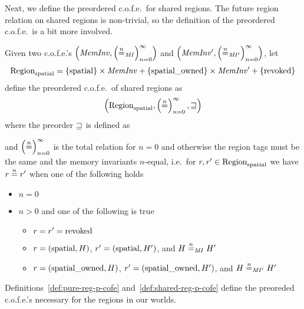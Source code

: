 \begin{jversion}
Next, we define the preordered c.o.f.e.\ for shared regions.
The future region relation on shared regions is non-trivial, so the definition of the preordered c.o.f.e.\ is a bit more involved.
\begin{definition}
  \label{def:shared-reg-p-cofe}
  Given two c.o.f.e.'s $\left(\var{MemInv},\left(\nequal[n]_\var{MI}\right)_{n=0}^{\infty}\right)$ and $\left(\var{MemInv'},\left(\nequal[n]_\var{MI'}\right)_{n=0}^{\infty}\right)$, let
  \[
    \Regions = \{\spatial\}\times \var{MemInv} + \{\spatialo\} \times \var{MemInv'} + \{\revoked\}
  \]
  define the preordered c.o.f.e.\ of shared regions as
  \[
  \left(\Regions,\left(\nequal[n]\right)_{n=0}^{\infty},\future\right)
  \]
  where the preorder $\future$ is defined as
  and $\left(\nequal[n]\right)_{n=0}^{\infty}$ is the total relation for $n=0$ and otherwise the region tags must be the same and the memory invariants $n$-equal, i.e.\ 
  for $r ,r' \in \Regions$ we have $r \nequal r'$ when one of the following holds
  \begin{itemize}
  \item $n=0$
  \item $n > 0$ and one of the following is true
    \begin{itemize}
    \item $r = r' = \revoked$
    \item $r = (\spatial,H)$, $r' = (\spatial,H')$, and $H \nequal_\var{MI} H'$
    \item $r = (\spatialo,H)$, $r' = (\spatialo,H')$, and $H \nequal_\var{MI'} H'$
    \end{itemize}
  \end{itemize}
\end{definition}
Definitions~\ref{def:pure-reg-p-cofe} and~\ref{def:shared-reg-p-cofe} define the preoreded c.o.f.e.'s necessary for the regions in our worlds.


\end{jversion}
